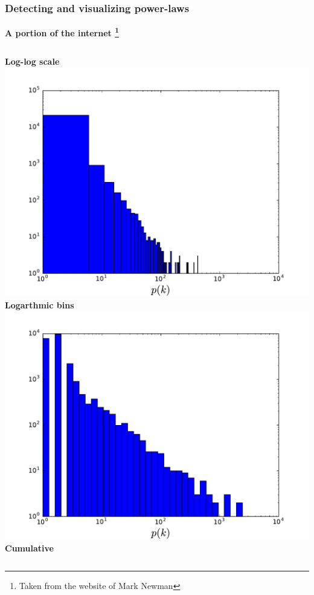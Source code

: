 \documentclass{beamer}
\begin{document}
\begin{frame}
    \frametitle{Detecting and visualizing power-laws}
    \centering
    {\bf A portion of the internet \footnote{Taken from the website of Mark Newman}}

    \vspace{2em}
    \begin{columns}
        \centering
        {\bf Log-log scale}
        \includegraphics[width=\columnwidth]{internet_loglog_hist.pdf}
        \centering
        {\bf Logarthmic bins}
        \includegraphics[width=\columnwidth]{internet_loglog_logbin_hist.pdf}
        \centering
        {\bf Cumulative }

\end{columns}
\end{frame}
\end{document}
